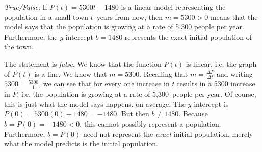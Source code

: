 \documentclass[11pt,letterpaper]{article}
\begin{document}
\quizsol \textit{True/False}: If $P(t)= 5300t - 1480$ is a linear model representing the population in a small town $t$~years from now, then $m= 5300 > 0$ means that the model says that the population is growing at a rate of 5,300 people per year. Furthermore, the $y$-intercept $b= 1480$ represents the exact initial population of the town. \pspace

\sol The statement is \textit{false}. We know that the function $P(t)$ is linear, i.e. the graph of $P(t)$ is a line. We know that $m= 5300$. Recalling that $m= \frac{\Delta P}{\Delta t}$ and writing $5300= \frac{5300}{1}$, we can see that for every one increase in $t$ results in a 5300 increase in $P$, i.e. the population is growing at a rate of 5,300~people per year. Of course, this is just what the model says happens, on average. The $y$-intercept is $P(0)= 5300(0) - 1480= -1480$. But then $b \neq 1480$. Because $b= P(0)= -1480 < 0$, this cannot possibly represent a population. Furthermore, $b= P(0)$ need not represent the \textit{exact} initial population, merely what the model predicts is the initial population. 
\end{document}
